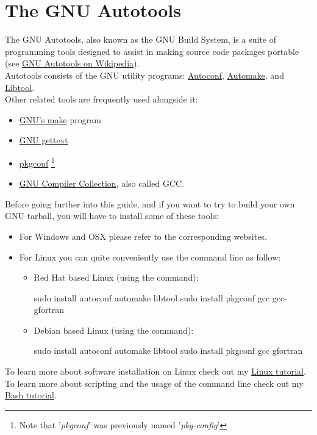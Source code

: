 \section{The GNU Autotools}

The GNU Autotools, also known as the GNU Build System, is a suite of programming tools designed to assist in making source code packages portable (see \href{https://en.wikipedia.org/wiki/GNU\_Autotools}{GNU Autotools on Wikipedia}).  \\[0.25cm]
Autotools consists of the GNU utility programs: \href{https://www.gnu.org/software/autoconf/}{Autoconf}, 
\href{https://www.gnu.org/software/automake/}{Automake}, and \href{https://www.gnu.org/software/libtool}{Libtool}. \\
Other related tools are frequently used alongside it: 
\begin{itemize}
\item \href{https://www.gnu.org/software/make/}{GNU's make} program
\item \href{https://www.gnu.org/software/gettext/}{GNU gettext}
\item \href{https://en.wikipedia.org/wiki/Pkg-config}{pkgconf} \footnote{Note that '{\em{pkgconf}}' was previously named '{\em{pkg-config}}'} 
\item \href{https://www.gnu.org/software/gcc/}{GNU Compiler Collection}, also called GCC. 
\end{itemize}
Before going further into this guide, and if you want to try to build your own GNU tarball, you will have to install some of these tools: 
\begin{itemize}
\item For Windows and OSX please refer to the corresponding websites.
\item For Linux you can quite conveniently use the command line as follow:
\begin{itemize}
\item Red Hat based Linux (using the  command):
\begin{scriptii}
\fprompt{~} sudo  install autoconf automake libtool
\fprompt{~} sudo  install pkgconf gcc gcc-gfortran
\end{scriptii}
\item Debian based Linux (using the  command):
\begin{scriptii}
\uprompt{~} sudo  install autoconf automake libtool
\uprompt{~} sudo  install pkgconf gcc gfortran
\end{scriptii}
\end{itemize}
\end{itemize}
To learn more about software installation on Linux check out my \href{https://www.ipcms.fr/wp-content/uploads/2021/11/linux.pdf}{Linux tutorial}. \\
To learn more about scripting and the usage of the command line check out my \href{https://www.ipcms.fr/wp-content/uploads/2021/05/bash.pdf}{Bash tutorial}.
\clearpage


